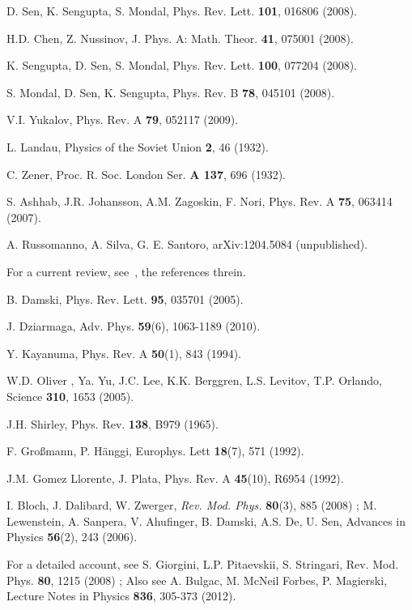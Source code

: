 \documentclass[aps,pra,floats,epsfig,pdflatex]{revtex4}                                                              %
\begin{document}
\begin{thebibliography}{}
D. Sen, K. Sengupta, S. Mondal, Phys. Rev. Lett. \textbf{101}, 016806 (2008).

H.D. Chen, Z. Nussinov, J. Phys. A: Math. Theor. \textbf{41}, 075001 (2008).

K. Sengupta, D. Sen, S. Mondal, Phys. Rev. Lett. \textbf{100}, 077204 (2008).

S. Mondal, D. Sen, K. Sengupta, Phys. Rev. B \textbf{78}, 045101 (2008).

V.I. Yukalov, Phys. Rev. A \textbf{79}, 052117 (2009).

L. Landau, Physics of the Soviet Union \textbf{2}, 46 (1932).

C. Zener, Proc. R. Soc. London Ser. \textbf{A 137}, 696 (1932).

S. Ashhab, J.R. Johansson, A.M. Zagoskin, F. Nori, Phys. Rev. A \textbf{75}, 063414 (2007).

A. Russomanno, A. Silva, G. E. Santoro, arXiv:1204.5084 (unpublished).

For a current review, see~\cite{bikashbabu}, the references threin.

B. Damski,  Phys. Rev. Lett. \textbf{95}, 035701 (2005).

J. Dziarmaga, Adv. Phys. \textbf{59}(6), 1063-1189 (2010).

Y. Kayanuma, Phys. Rev. A \textbf{50}(1), 843 (1994).

W.D. Oliver , Ya. Yu, J.C. Lee, K.K. Berggren, L.S. Levitov, T.P. Orlando, Science \textbf{310}, 1653 (2005).

J.H. Shirley, Phys. Rev. \textbf{138}, B979 (1965).

F. Gro\ss mann, P. H\"anggi, Europhys. Lett \textbf{18}(7), 571 (1992).

J.M. Gomez Llorente, J. Plata, Phys. Rev. A \textbf{45}(10), R6954 (1992).

I. Bloch, J. Dalibard, W. Zwerger, {\em Rev. Mod. Phys.} \textbf{80}(3), 885 (2008) ; M. Lewenstein, A. Sanpera, V. Ahufinger, B. Damski, A.S. De, U. Sen, {Advances in Physics} \textbf{56}(2), 243 (2006).

For a detailed account, see  S. Giorgini, L.P.  Pitaevskii, S. Stringari, {Rev. Mod. Phys.} \textbf{80}, 1215 (2008)  ; Also see A. Bulgac, M. McNeil Forbes, P. Magierski, {Lecture Notes in Physics} \textbf{836}, 305-373 (2012).


\end{thebibliography}
\end{document}
